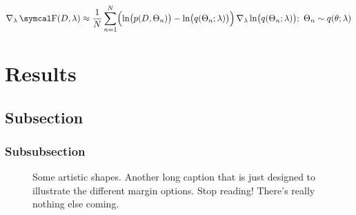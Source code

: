 \documentclass[a4paper, 11pt]{lt_article}
\begin{document}
\begin{equation}
    \del_{\lambda} \func{\FreeEnergy}{D, \lambda}
    \approx
    \frac{1}{N} \sum_{n=1}^{N} \Bigl(
        \lnFunc{\dist{p}{D, \Theta_{n}}}
        - \lnFunc{\pDist{q}{\Theta_{n}}{\lambda}}
    \Bigr)
    \del_{\lambda} \lnFunc{\pDist{q}{\Theta_{n}}{\lambda}};
    \,\, \Theta_{n} \sim \pDist{q}{\theta}{\lambda}
\end{equation}

\blindtext


\section{Results} %

\subsection{Subsection} %

\Blindtext[1]

\subsubsection{Subsubsection}
\blindtext

\begin{figure}[tbp] %
\centering

%
\quad  %
%

\caption{
    Some artistic shapes. Another long caption that is just designed to
    illustrate the different margin options. Stop reading! There's really
    nothing else coming.
}
\label{fig:Shapes}
\end{figure} %
\end{document}
